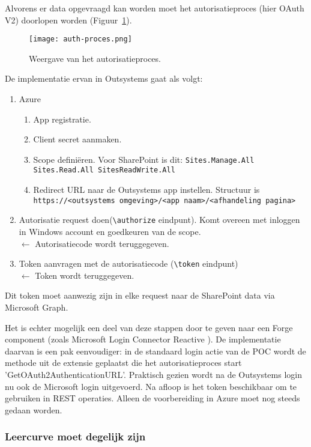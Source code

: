 Alvorens er data opgevraagd kan worden moet het autorisatieproces (hier OAuth V2) doorlopen worden (Figuur~\ref{fig:auth-proces}).

\begin{figure}[h!]
    \centering
    \texttt{[image: auth-proces.png]}
    \caption{Weergave van het autorisatieproces. \autocite{MSLCT2019}}
    \label{fig:auth-proces}
\end{figure}

De implementatie ervan in Outsystems gaat als volgt:
\begin{enumerate}
    \item Azure
    \begin{enumerate}
        \item App registratie.
        \item Client secret aanmaken.
        \item Scope definiëren. Voor SharePoint is dit: \lstinline|Sites.Manage.All Sites.Read.All SitesReadWrite.All|
        \item Redirect URL naar de Outsystems app instellen. Structuur is \lstinline|https://<outsystems omgeving>/<app naam>/<afhandeling pagina>| 
    \end{enumerate}
    \item Autorisatie request doen(\lstinline|\authorize| eindpunt). Komt overeen met inloggen in Windows account en goedkeuren van de scope.\\
    $\leftarrow$ Autorisatiecode wordt teruggegeven.
    \item Token aanvragen met de autorisatiecode (\lstinline|\token| eindpunt)\\
    $\leftarrow$ Token wordt teruggegeven.
\end{enumerate}
Dit token moet aanwezig zijn in elke request naar de SharePoint data via Microsoft Graph.

Het is echter mogelijk een deel van deze stappen door te geven naar een Forge component (zoals Microsoft Login Connector Reactive \autocite{MSLCT2019}). De implementatie daarvan is een pak eenvoudiger: in de standaard login actie van de POC wordt de methode uit de extensie geplaatst die het autorisatieproces start 'GetOAuth2AuthenticationURL'. Praktisch gezien wordt na de Outsystems login nu ook de Microsoft login uitgevoerd. Na afloop is het token beschikbaar om te gebruiken in REST operaties. Alleen de voorbereiding in Azure moet nog steeds gedaan worden.

\subsubsection{Leercurve moet degelijk zijn}

